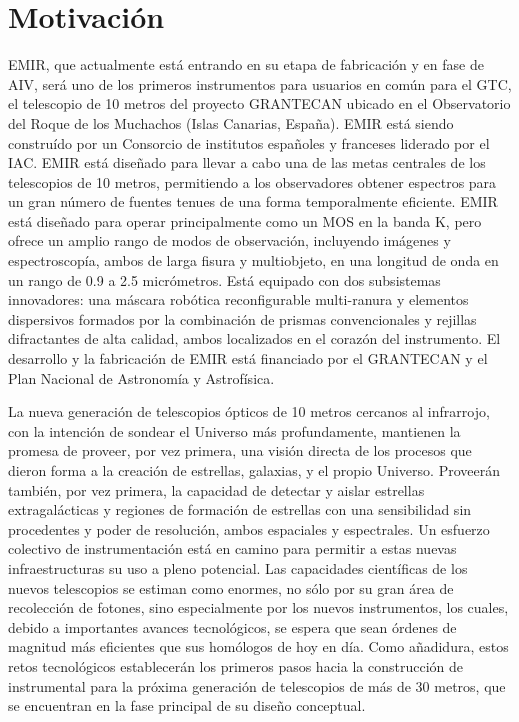 %
%
%
%

\chapter{Motivación} \label{chap:motivacion}
EMIR, que actualmente está entrando en su etapa de fabricación y en fase de AIV, será uno
de los primeros instrumentos para usuarios en común para el GTC, el telescopio
de 10 metros del proyecto GRANTECAN ubicado en el Observatorio del
Roque de los Muchachos (Islas Canarias, España). EMIR está siendo construído por
un Consorcio de institutos españoles y franceses liderado por el IAC. 
EMIR está diseñado para llevar a cabo una de las
metas centrales de los telescopios de 10 metros, permitiendo a los
observadores obtener espectros para un gran número de fuentes tenues de una
forma temporalmente eficiente. EMIR está diseñado para operar principalmente
como un MOS en la banda K, pero ofrece un amplio rango de modos de observación,
incluyendo imágenes y espectroscopía, ambos de larga fisura y multiobjeto, en
una longitud de onda en un rango de 0.9 a 2.5 micrómetros. Está equipado con dos
subsistemas innovadores: una máscara robótica reconfigurable multi-ranura y
elementos dispersivos formados por la combinación de prismas convencionales y
rejillas difractantes de alta calidad, ambos localizados en el corazón del
instrumento. 
El desarrollo y la fabricación de EMIR está financiado por el GRANTECAN y el Plan
Nacional de Astronomía y Astrofísica.

La nueva generación de telescopios ópticos de 10 metros cercanos al infrarrojo,
con la intención de sondear el Universo más
profundamente, mantienen la promesa de proveer, por vez primera, una visión
directa de los procesos que dieron forma a la creación de estrellas, galaxias, y
el propio Universo. Proveerán también, por vez primera, la capacidad de detectar
y aislar estrellas extragalácticas y regiones de formación de estrellas con una
sensibilidad sin procedentes y poder de resolución, ambos espaciales y
espectrales. Un esfuerzo colectivo de instrumentación está en camino para
permitir a estas nuevas infraestructuras su uso a pleno potencial. Las
capacidades científicas de los nuevos telescopios se estiman como enormes, no
sólo por su gran área de recolección de fotones, sino especialmente por los
nuevos instrumentos, los cuales, debido a importantes avances tecnológicos, se
espera que sean órdenes de magnitud más eficientes que sus homólogos de hoy en
día. Como añadidura, estos retos tecnológicos establecerán los primeros pasos
hacia la construcción de instrumental para la próxima generación de telescopios
de más de 30 metros, que se encuentran en la fase principal de su diseño
conceptual.


